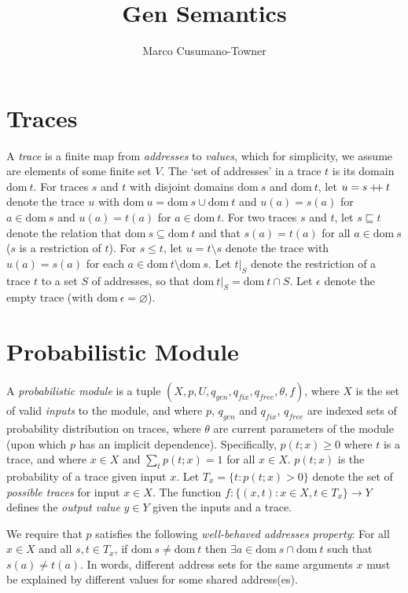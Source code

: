 \documentclass{article}
\title{Gen Semantics}
\author{Marco Cusumano-Towner}
\newcommand\doubleplus{\mathbin{+\mkern-5mu+}}
\newcommand{\concat}[0]{\doubleplus}
\newcommand{\diff}[0]{\setminus}
\newcommand{\dom}[1]{\mbox{dom}{~#1}}
\newcommand{\emptytrace}[0]{\epsilon}
\newcommand{\contained}[0]{\sqsubseteq}
\begin{document}
\maketitle

\section{Traces}
A \emph{trace} is a finite map from \emph{addresses} to \emph{values}, which for simplicity, we assume are elements of some finite set $V$.
The `set of addresses' in a trace $t$ is its domain $\dom{t}$.
For traces $s$ and $t$ with disjoint domains $\dom{s}$ and $\dom{t}$, let $u = s \concat t$ denote the trace $u$ with $\dom{u} = \dom{s} \cup \dom{t}$ and $u(a) = s(a)$ for $a \in \dom{s}$ and $u(a) = t(a)$ for $a \in \dom{t}$.
For two traces $s$ and $t$, let $s \contained t$ denote the relation that $\dom{s} \subseteq \dom{t}$ and that $s(a) = t(a)$ for all $a \in \dom{s}$ ($s$ is a restriction of $t$).
For $s \le t$, let $u = t \diff s$ denote the trace with $u(a) = s(a)$ for each $a \in \dom{t} \setminus \dom{s}$.
Let $t|_S$ denote the restriction of a trace $t$ to a set $S$ of addresses, so that $\dom{t|_S} = \dom{t} \cap S$.
Let $\emptytrace$ denote the empty trace (with $\dom \emptytrace = \varnothing$).

\section{Probabilistic Module}
A \emph{probabilistic module} is a tuple $(X, p, U, q_{gen}, q_{fix}, q_{free}, \theta, f)$, where $X$ is the set of valid \emph{inputs} to the module, and where $p$, $q_{gen}$ and $q_{fix}$, $q_{free}$ are indexed sets of probability distribution on traces, where $\theta$ are current parameters of the module (upon which $p$ has an implicit dependence).
Specifically, $p(t; x) \ge 0$ where $t$ is a trace, and where $x \in X$ and $\sum_t p(t; x) = 1$ for all $x \in X$.
$p(t; x)$ is the probability of a trace given input $x$.
Let $T_x = \{t : p(t; x) > 0 \}$ denote the set of \emph{possible traces} for input $x \in X$.
The function $f : \{(x, t) : x \in X, t \in T_x\} \to Y$ defines the \emph{output value} $y \in Y$ given the inputs and a trace.

We require that $p$ satisfies the following \emph{well-behaved addresses property}:
For all $x \in X$ and all $s, t \in T_x$, if $\dom{s} \ne \dom{t}$ then $\exists a \in \dom{s} \cap \dom{t}$ such that $s(a) \ne t(a)$.
In words, different address sets for the same arguments $x$ must be explained by different value{s} for some shared address(es).
\end{document}
